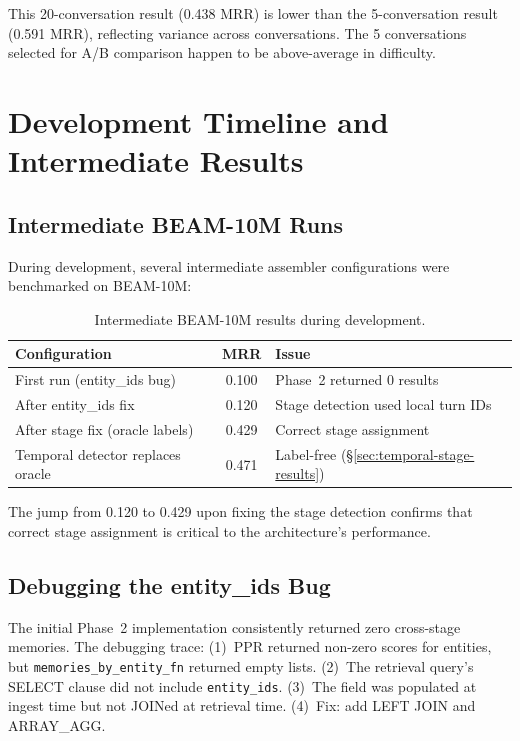 \documentclass[11pt]{article}
\begin{document}
This 20-conversation result (0.438 MRR) is lower than the
5-conversation result (0.591 MRR), reflecting variance across
conversations.  The 5 conversations selected for A/B comparison
happen to be above-average in difficulty.

\section{Development Timeline and Intermediate Results}
\label{app:dev-timeline}

\subsection{Intermediate BEAM-10M Runs}

During development, several intermediate assembler configurations
were benchmarked on BEAM-10M:

\begin{table}[h]
\centering
\caption{Intermediate BEAM-10M results during development.}
\label{tab:intermediate}
\begin{tabular}{lcp{5cm}}
\toprule
Configuration & MRR & Issue \\
\midrule
First run (entity\_ids bug) & 0.100 & Phase~2 returned 0 results \\
After entity\_ids fix & 0.120 & Stage detection used local turn IDs \\
After stage fix (oracle labels) & 0.429 & Correct stage assignment \\
Temporal detector replaces oracle & 0.471 & Label-free (\S\ref{sec:temporal-stage-results}) \\
\bottomrule
\end{tabular}
\end{table}

The jump from 0.120 to 0.429 upon fixing the stage detection confirms
that correct stage assignment is critical to the architecture's
performance.

\subsection{Debugging the entity\_ids Bug}

The initial Phase~2 implementation consistently returned zero
cross-stage memories.  The debugging trace: (1)~PPR returned non-zero
scores for entities, but \texttt{memories\_by\_entity\_fn} returned
empty lists.  (2)~The retrieval query's SELECT clause did not include
\texttt{entity\_ids}.  (3)~The field was populated at ingest time but
not JOINed at retrieval time.  (4)~Fix: add LEFT JOIN and
ARRAY\_AGG.
\end{document}
